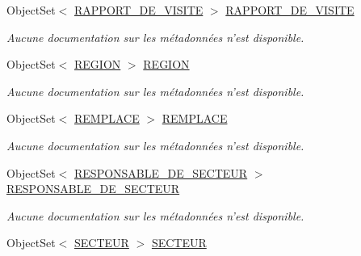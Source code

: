 \begin{DoxyCompactItemize}
Object\-Set$<$ \hyperlink{class_model_1_1_r_a_p_p_o_r_t___d_e___v_i_s_i_t_e}{R\-A\-P\-P\-O\-R\-T\-\_\-\-D\-E\-\_\-\-V\-I\-S\-I\-T\-E} $>$ \hyperlink{class_model_1_1_b_d_d___s_i_o7_entities_a965f341d58028327c607a34ec17fcafc}{R\-A\-P\-P\-O\-R\-T\-\_\-\-D\-E\-\_\-\-V\-I\-S\-I\-T\-E}
\begin{DoxyCompactList}\small\item\em Aucune documentation sur les métadonnées n'est disponible. \end{DoxyCompactList}\item 
Object\-Set$<$ \hyperlink{class_model_1_1_r_e_g_i_o_n}{R\-E\-G\-I\-O\-N} $>$ \hyperlink{class_model_1_1_b_d_d___s_i_o7_entities_abd0de3daf7a53c5a9b8d90c24bb67971}{R\-E\-G\-I\-O\-N}
\begin{DoxyCompactList}\small\item\em Aucune documentation sur les métadonnées n'est disponible. \end{DoxyCompactList}\item 
Object\-Set$<$ \hyperlink{class_model_1_1_r_e_m_p_l_a_c_e}{R\-E\-M\-P\-L\-A\-C\-E} $>$ \hyperlink{class_model_1_1_b_d_d___s_i_o7_entities_a7403c47fc7f420ea1ad4f103a12b96c5}{R\-E\-M\-P\-L\-A\-C\-E}
\begin{DoxyCompactList}\small\item\em Aucune documentation sur les métadonnées n'est disponible. \end{DoxyCompactList}\item 
Object\-Set$<$ \hyperlink{class_model_1_1_r_e_s_p_o_n_s_a_b_l_e___d_e___s_e_c_t_e_u_r}{R\-E\-S\-P\-O\-N\-S\-A\-B\-L\-E\-\_\-\-D\-E\-\_\-\-S\-E\-C\-T\-E\-U\-R} $>$ \hyperlink{class_model_1_1_b_d_d___s_i_o7_entities_a6176c375621ed6fa48307b4c0c12c030}{R\-E\-S\-P\-O\-N\-S\-A\-B\-L\-E\-\_\-\-D\-E\-\_\-\-S\-E\-C\-T\-E\-U\-R}
\begin{DoxyCompactList}\small\item\em Aucune documentation sur les métadonnées n'est disponible. \end{DoxyCompactList}\item 
Object\-Set$<$ \hyperlink{class_model_1_1_s_e_c_t_e_u_r}{S\-E\-C\-T\-E\-U\-R} $>$ \hyperlink{class_model_1_1_b_d_d___s_i_o7_entities_a6c7e5e2098c03456f950dd088b6507ef}{S\-E\-C\-T\-E\-U\-R}

\end{DoxyCompactItemize}
